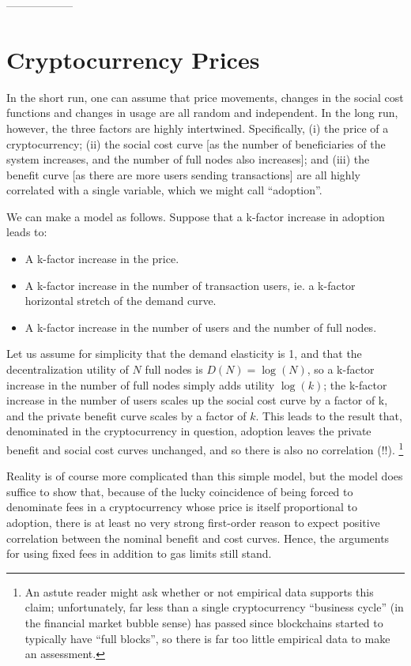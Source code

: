 \documentclass[12pt, final]{article}
\begin{document}
------------------

\section{Cryptocurrency Prices}

In the short run, one can assume that price movements, changes in the social cost functions and changes in usage are all random and independent. In the long run, however, the three factors are highly intertwined. Specifically, (i) the price of a cryptocurrency; (ii) the social cost curve [as the number of beneficiaries of the system increases, and the number of full nodes also increases]; and (iii) the benefit curve [as there are more users sending transactions] are all highly correlated with a single variable, which we might call ``adoption''.

We can make a model as follows. Suppose that a k-factor increase in adoption leads to:

\begin{itemize}
    \item A k-factor increase in the price.
    \item A k-factor increase in the number of transaction users, ie. a k-factor horizontal stretch of the demand curve.
    \item A k-factor increase in the number of users and the number of full nodes.
\end{itemize}

Let us assume for simplicity that the demand elasticity is 1, and that the decentralization utility of $N$ full nodes is $D(N) = \log(N)$, so a k-factor increase in the number of full nodes simply adds utility $\log(k)$; the k-factor increase in the number of users scales up the social cost curve by a factor of k, and the private benefit curve scales by a factor of $k$. This leads to the result that, denominated in the cryptocurrency in question, adoption leaves the private benefit and social cost curves unchanged, and so there is also no correlation (!!). \footnote{An astute reader might ask whether or not empirical data supports this claim; unfortunately, far less than a single cryptocurrency ``business cycle'' (in the financial market bubble sense) has passed since blockchains started to typically have ``full blocks'', so there is far too little empirical data to make an assessment.}

Reality is of course more complicated than this simple model, but the model does suffice to show that, because of the lucky coincidence of being forced to denominate fees in a cryptocurrency whose price is itself proportional to adoption, there is at least no very strong first-order reason to expect positive correlation between the nominal benefit and cost curves. Hence, the arguments for using fixed fees in addition to gas limits still stand.
\end{document}
